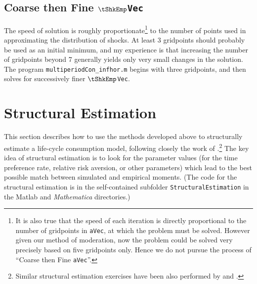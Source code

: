 \documentclass[titlepage]{\econtex}
\newcommand{\Mma}{\textit{Mathematica}}
\begin{document}

\subsection{Coarse then Fine \texttt{$\tShkEmp$Vec}}

The speed of solution is roughly proportionate\footnote{It is also
  true that the speed of each iteration is directly proportional to
  the number of gridpoints in \texttt{aVec}, at which the problem must
  be solved. However given our method of moderation, now the problem
  could be solved very precisely based on five gridpoints only. Hence
  we do not pursue the process of ``Coarse then Fine \texttt{aVec}''.}
to the number of points used in approximating the distribution of
shocks.  At least 3 gridpoints should probably be used as an initial
minimum, and my experience is that increasing the number of gridpoints
beyond 7 generally yields only very small changes in the solution.  The program
\texttt{multiperiodCon\_infhor.m}
begins with three gridpoints, and then solves for successively finer
\texttt{$\tShkEmp$Vec}.

\hypertarget{StructuralEstimation}{}
\section{Structural Estimation}

This section describes how to use the methods developed above to
structurally estimate a life-cycle consumption model, following
closely the work of
\cite{cagettiWprofiles}.\footnote{Similar structural
  estimation exercises have been also performed by
  \cite{palumbo:medical} and \cite{gpLifecycle}.} The key idea of
structural estimation is to look for the parameter values (for the
time preference rate, relative risk aversion, or other parameters)
which lead to the best possible match between simulated and empirical
moments.  (The code for the structural estimation is in the self-contained
subfolder \texttt{StructuralEstimation} in the Matlab and {\Mma} directories.)
\end{document}
